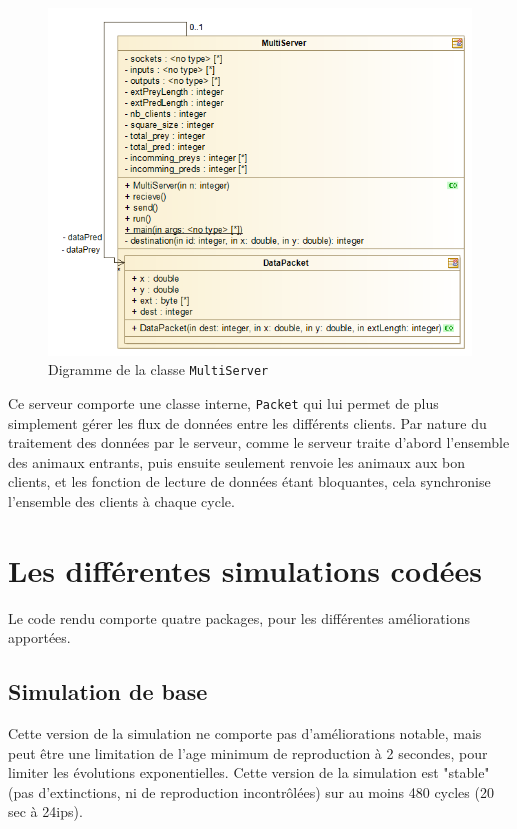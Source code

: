 \documentclass[12pt,a4paper,titlepage]{article}
\begin{document}
\begin{figure}[h]
\includegraphics[width = \textwidth]{"../diagrammes/server"}
\caption{Digramme de la classe \texttt{MultiServer}}
\label{server}
\end{figure}

Ce serveur comporte une classe interne, \texttt{Packet} qui lui permet de plus simplement gérer les flux de données entre les différents clients. Par nature du traitement des données par le serveur, comme le serveur traite d'abord l'ensemble des animaux entrants, puis ensuite seulement renvoie les animaux aux bon clients, et les fonction de lecture de données étant bloquantes, cela synchronise l'ensemble des clients à chaque cycle.
\FloatBarrier
\section{Les différentes simulations codées}

Le code rendu comporte quatre packages, pour les différentes améliorations apportées.

\subsection{Simulation de base}
Cette version de la simulation ne comporte pas d'améliorations notable, mais peut être une limitation de l'age minimum de reproduction à 2 secondes, pour limiter les évolutions exponentielles. Cette version de la simulation est "stable" (pas d'extinctions, ni de reproduction incontrôlées) sur au moins 480 cycles (20 sec à 24ips).
\end{document}
